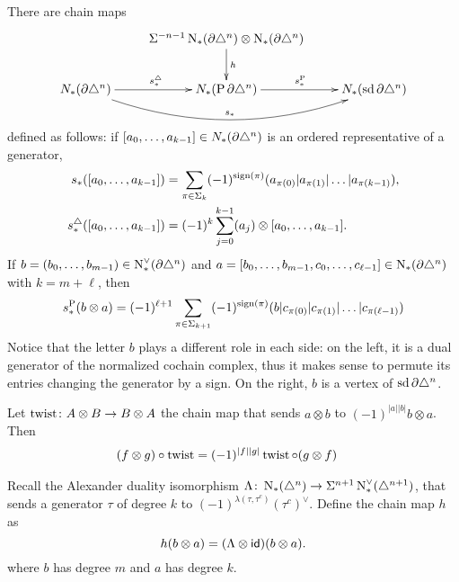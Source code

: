 There are chain maps
\[
\xymatrix{
	&\susp{-n-1}\chains(\partial\simplex^n)\otimes \chains(\partial\simplex^n)\ar[d]^h& \\
	\cadenas(\partial\simplex^n)\ar[r]^{s_*^{\simplex}}\ar@/_2.0pc/[rr]^{s_*} & \cadenas(\Psd \partial\simplex^n)\ar[r]^{s^{\Psd}_*} & \cadenas(\sd\partial\simplex^n)
}
\]
defined as follows: if $[a_0,\ldots,a_{k-1}]\in N_{*}(\partial\triangle^n)$ is an ordered representative of a generator,
\begin{align*}
	s_*([a_0,\ldots,a_{k-1}]) &= \sum_{\pi\in \Sigma_{k}} (-1)^{\operatorname{sign}(\pi)}(a_{\pi(0)}|a_{\pi(1)}|\ldots|a_{\pi(k-1)}),
	\\
	s_*^{\triangle}([a_0,\ldots,a_{k-1}]) &= (-1)^{k}\sum_{j=0}^{k-1} (a_j)\otimes [a_0,\ldots,a_{k-1}].
\end{align*}
If $b = (b_0,\ldots,b_{m-1})\in \operatorname{N}^\vee_{*}(\partial\triangle^n)$ and $a = [b_0,\ldots,b_{m-1},c_0,\ldots,c_{\ell-1}]\in \operatorname{N}_{*}(\partial\triangle^n)$ with $k = m+\ell$, then
\begin{equation}\label{eq:sP}
	s_*^{\operatorname{P}}(b\otimes a) = (-1)^{\ell+1}\sum_{\pi\in \Sigma_{k+1}} (-1)^{\operatorname{sign}(\pi)} (b|c_{\pi(0)}|c_{\pi(1)}|\ldots|c_{\pi(\ell-1)})
\end{equation}
Notice that the letter $b$ plays a different role in each side: on the left, it is a dual generator of the normalized cochain complex, thus it makes sense to permute its entries changing the generator by a sign. On the right, $b$ is a vertex of $\operatorname{sd}\partial\triangle^n$.

\begin{remark}
	Let $\operatorname{twist}\colon A\otimes B\to B\otimes A$ the chain map that sends $a\otimes b$ to $(-1)^{|a||b|}b\otimes a$. Then
	\begin{align*}
		(f\otimes g)\circ \operatorname{twist} &= (-1)^{|f||g|}\operatorname{twist} \circ (g\otimes f)
	\end{align*}
\end{remark}

Recall the Alexander duality isomorphism $\Lambda\colon \operatorname{N}_{*}(\triangle^n) \to \Sigma^{n+1}\operatorname{N}^\vee_{*}(\triangle^{n+1})$, that sends a generator $\tau$ of degree $k$ to $(-1)^{\lambda(\tau,\tau^c)} (\tau^c)^{\vee}$. Define the chain map $h$ as
\[
h( b\otimes a) = (\Lambda\otimes \mathsf{id})(b\otimes a).
\]
where $b$ has degree $m$ and $a$ has degree $k$.

